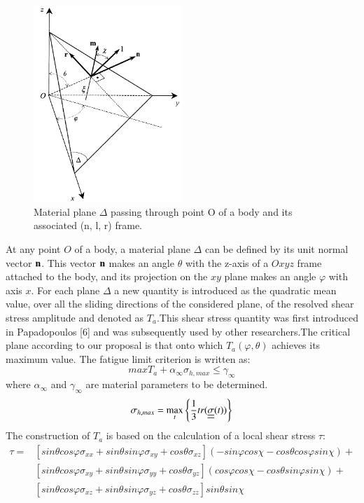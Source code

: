 \documentclass[3p,times,procedia,number]{elsarticle}
\begin{document}
\begin{figure}[h!]
	\centering
	\includegraphics[width=0.5\textwidth]{figures//demopp.png} 
	\caption{Material plane $\Delta$ passing through point O of a body and its
		associated (n, l, r) frame.}
	\label{fig50}
\end{figure}
At any point $O$ of a body, a material plane $\Delta$ can be defined by its unit normal vector $\bf n$. This vector
$\bf n$ makes an angle $\theta$ with the z-axis of a $Oxyz$ frame attached to the body, and its projection on the $xy$ plane
makes an angle $\varphi$ with axis $x$. For each plane $\Delta$ a new quantity is introduced as the quadratic mean value, over all the sliding directions of the considered plane, of the resolved shear stress amplitude and denoted as $T_a$.This shear stress quantity was first introduced in Papadopoulos [6]
and was subsequently used by other researchers.The critical plane according to our proposal is that onto which $T_a(\varphi,\theta)$ achieves its maximum value. The fatigue limit criterion is written as:
\begin{equation}
max T_a+\alpha_\infty \sigma_{h,max}\leqslant \gamma_\infty
\end{equation}
where $\alpha_\infty$ and $\gamma_\infty$ are material parameters to be determined\cite{papadopoulos2001long}.
$$\sigma_{h,max}=\max\limits_{t}\left\lbrace \dfrac{1}{3}tr(\uline{\uline{\sigma}}(t))\right\rbrace $$
The construction of $T_a$ is based on the calculation of a local shear stress $\tau$:
\begin{equation}
\begin{split}
\tau=&[sin\theta cos\varphi\sigma_{xx}+sin\theta sin\varphi\sigma_{xy}+cos\theta\sigma_{xz}](-sin\varphi cos\chi-cos\theta cos\varphi sin\chi)+\\&[sin\theta cos\varphi\sigma_{xy}+sin\theta sin\varphi\sigma_{yy}+cos\theta\sigma_{yz}](cos\varphi cos\chi-cos\theta sin\varphi sin\chi)+\\&[sin\theta cos\varphi\sigma_{xz}+sin\theta sin\varphi\sigma_{yz}+cos\theta\sigma_{zz}]sin\theta sin\chi
\end{split} 
\label{eqres}
\end{equation}
\end{document}
